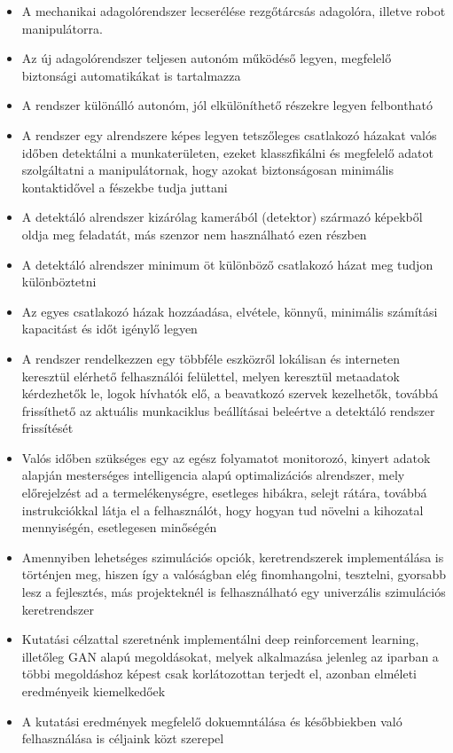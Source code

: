 \documentclass{article}
\begin{document}
\begin{itemize}
    \item A mechanikai adagolórendszer lecserélése rezgőtárcsás adagolóra, illetve robot manipulátorra. 
    \item Az új adagolórendszer teljesen autonóm működéső legyen, megfelelő biztonsági automatikákat is tartalmazza
    \item A rendszer különálló autonóm, jól elkülöníthető részekre legyen felbontható
    \item A rendszer egy alrendszere képes legyen tetszőleges csatlakozó házakat valós időben detektálni a munkaterületen, ezeket klasszfikálni és megfelelő adatot szolgáltatni a manipulátornak, hogy azokat biztonságosan minimális kontaktidővel a fészekbe tudja juttani
    \item A detektáló alrendszer kizárólag kamerából (detektor) származó képekből oldja meg feladatát, más szenzor nem használható ezen részben
    \item A detektáló alrendszer minimum öt különböző csatlakozó házat meg tudjon különböztetni
    \item Az egyes csatlakozó házak hozzáadása, elvétele, könnyű, minimális számítási kapacitást és időt igénylő legyen
    \item A rendszer rendelkezzen egy többféle eszközről lokálisan és interneten keresztül elérhető felhasználói felülettel, melyen keresztül metaadatok kérdezhetők le, logok hívhatók elő, a beavatkozó szervek kezelhetők, továbbá frissíthető az aktuális munkaciklus beállításai beleértve a detektáló rendszer frissítését
    \item Valós időben szükséges egy az egész folyamatot monitorozó, kinyert adatok alapján mesterséges intelligencia alapú optimalizációs alrendszer, mely előrejelzést ad a termelékenységre, esetleges hibákra, selejt rátára, továbbá instrukciókkal látja el a felhasználót, hogy hogyan tud növelni a kihozatal mennyiségén, esetlegesen minőségén
    \item Amennyiben lehetséges szimulációs opciók, keretrendszerek implementálása is történjen meg, hiszen így a valóságban elég finomhangolni, tesztelni, gyorsabb lesz a fejlesztés, más projekteknél is felhasználható egy univerzális szimulációs keretrendszer
    \item Kutatási célzattal szeretnénk implementálni deep reinforcement learning, illetőleg GAN alapú megoldásokat, melyek alkalmazása jelenleg az iparban a többi megoldáshoz képest csak korlátozottan terjedt el, azonban elméleti eredményeik kiemelkedőek
    \item A kutatási eredmények megfelelő dokuemntálása és későbbiekben való felhasználása is céljaink közt szerepel
\end{itemize}
\newpage
\end{document}

